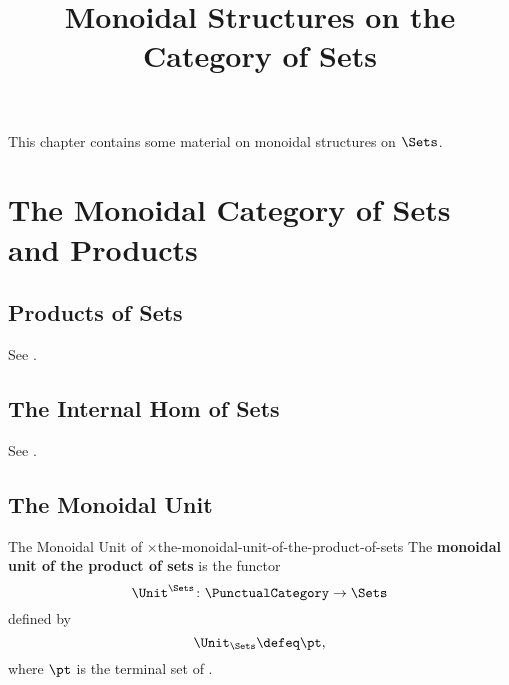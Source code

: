 

%



\title{Monoidal Structures on the Category of Sets}

\maketitle

\label{section-phantom}

This chapter contains some material on monoidal structures on $\Sets$.

\ChapterTableOfContents

\section{The Monoidal Category of Sets and Products}\label{section-the-monoidal-category-of-sets-and-products}
\subsection{Products of Sets}\label{subsection-the-monoidal-category-of-sets-and-products-products-of-sets}
See .
\subsection{The Internal Hom of Sets}\label{subsection-the-monoidal-category-of-sets-and-products-the-internal-hom-of-sets}
See .
\subsection{The Monoidal Unit}\label{subsection-the-monoidal-category-of-sets-and-products-the-monoidal-unit-of-the-product-of-sets}
\begin{definition}{The Monoidal Unit of $\times$}{the-monoidal-unit-of-the-product-of-sets}%
    The \textbf{monoidal unit of the product of sets} is the functor
    \[
        \Unit^{\Sets}
        \colon
        \PunctualCategory
        \to
        \Sets
    \]%
    defined by
    \[
        \Unit_{\Sets}%
        \defeq%
        \pt,
    \]%
    where $\pt$ is the terminal set of .
\end{definition}
